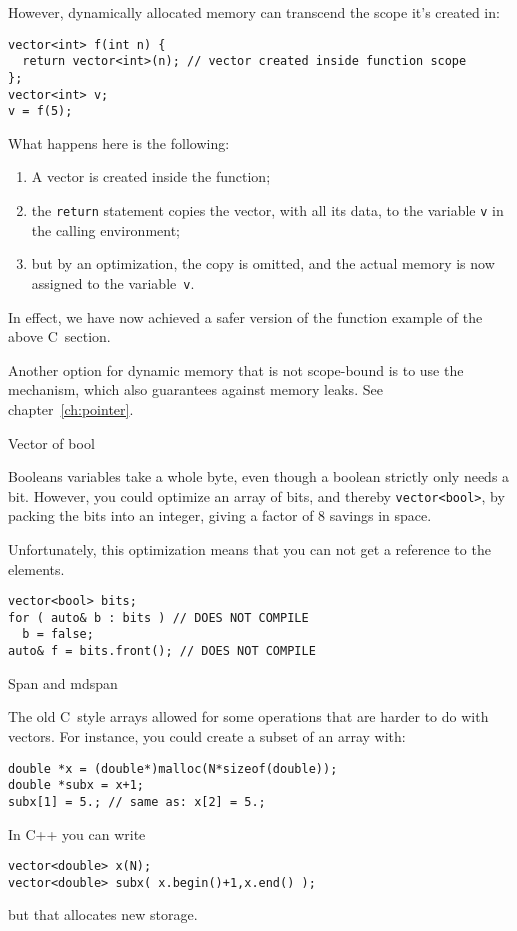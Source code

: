 However, dynamically allocated memory can transcend the scope
it's created in:
\begin{lstlisting}
vector<int> f(int n) {
  return vector<int>(n); // vector created inside function scope
};
vector<int> v;
v = f(5);
\end{lstlisting}
What happens here is the following:
\begin{enumerate}
\item A vector is created inside the function;
\item the \lstinline{return} statement copies the vector,
  with all its data, to the variable \lstinline{v}
  in the calling environment;
\item but by an optimization, the copy is omitted, and the actual
  memory is now assigned to the variable~\lstinline{v}.
\end{enumerate}
In effect, we have now achieved a safer version of the function example
of the above C~section.

Another option for dynamic memory that is not scope-bound
is to use the  mechanism,
which also guarantees against memory leaks. See chapter~\ref{ch:pointer}.

 {Vector of bool}

Booleans variables take a whole byte, even though
a boolean strictly only needs a bit.
However, you could optimize an array of bits,
and thereby \lstinline+vector<bool>+,
by packing the bits into an integer,
giving a factor of 8 savings in space.

Unfortunately, this optimization means that you can not
get a reference to the elements.
\begin{lstlisting}
vector<bool> bits;
for ( auto& b : bits ) // DOES NOT COMPILE
  b = false;
auto& f = bits.front(); // DOES NOT COMPILE
\end{lstlisting}

 {Span and mdspan}
\label{sec:gsl-span}

The old C~style arrays allowed for some operations that are harder to
do with vectors. For instance, you could create a subset of an array with:
\begin{lstlisting}
double *x = (double*)malloc(N*sizeof(double));
double *subx = x+1;
subx[1] = 5.; // same as: x[2] = 5.;
\end{lstlisting}
In C++ you can write
\begin{lstlisting}
vector<double> x(N);
vector<double> subx( x.begin()+1,x.end() );
\end{lstlisting}
but that allocates new storage.

